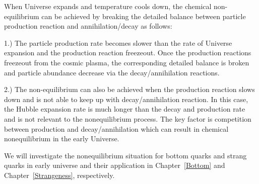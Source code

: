 When Universe expands and temperature cools down, the chemical non-equilibrium can be achieved by breaking the detailed balance between particle production reaction and annihilation/decay as follows:

1.) The particle production rate becomes slower than the rate of Universe expansion and the production reaction freezeout. Once the production reactions freezeout from the cosmic plasma, the corresponding detailed balance is broken and particle abundance decrease via the decay/annihilation reactions.
 

2.) The non-equilibrium can also be achieved when the production reaction slows down and is not able to keep up with decay/annihilation reaction. In this case, the Hubble expansion rate is much longer than the decay and production rate and is not relevant to the nonequilibrium process. The key factor is competition between production and decay/annihilation  which can result in chemical nonequilibrium in the early Universe.

\noindent We will investigate the nonequilibrium situation for bottom quarks and strang quarks in early universe and their application in Chapter~\ref{Bottom} and Chapter~\ref{Strangeness}, respectively.  

